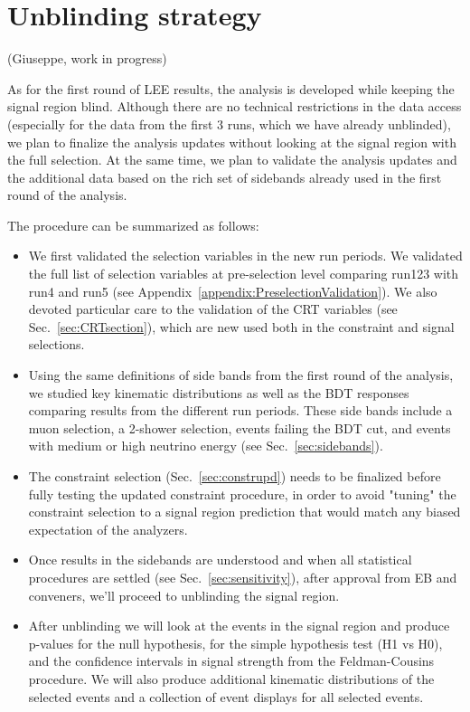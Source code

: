\newpage
\section{Unblinding strategy}
(Giuseppe, work in progress)

As for the first round of LEE results, the analysis is developed while keeping the signal region blind. Although there are no technical restrictions in the data access (especially for the data from the first 3 runs, which we have already unblinded), we plan to finalize the analysis updates without looking at the signal region with the full selection. At the same time, we plan to validate the analysis updates and the additional data based on the rich set of sidebands already used in the first round of the analysis.

The procedure can be summarized as follows:
\begin{itemize}
    \item We first validated the selection variables in the new run periods. We validated the full list of selection variables at pre-selection level comparing run123 with run4 and run5 (see Appendix~\ref{appendix:PreselectionValidation}). We also devoted particular care to the validation of the CRT variables (see Sec.~\ref{sec:CRTsection}), which are new used both in the constraint and signal selections.
    \item Using the same definitions of side bands from the first round of the analysis, we studied key kinematic distributions as well as the BDT responses comparing results from the different run periods. These side bands include a muon selection, a 2-shower selection, events failing the BDT cut, and events with medium or high neutrino energy (see Sec.~\ref{sec:sidebands}).
    \item The constraint selection (Sec.~\ref{sec:construpd}) needs to be finalized before fully testing the updated constraint procedure, in order to avoid "tuning" the constraint selection to a signal region prediction that would match any biased expectation of the analyzers.
    \item Once results in the sidebands are understood and when all statistical procedures are settled (see Sec.~\ref{sec:sensitivity}), after approval from EB and conveners, we'll proceed to unblinding the signal region. 
    \item After unblinding we will look at the events in the signal region and produce p-values for the null hypothesis, for the simple hypothesis test (H1 vs H0), and the confidence intervals in signal strength from the Feldman-Cousins procedure. We will also produce additional kinematic distributions of the selected events and a collection of event displays for all selected events.
\end{itemize}